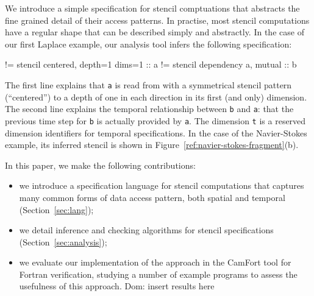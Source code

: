 \documentclass[9pt]{sigplanconf}
\newcommand{\dnote}[1]{\textcolor{darkpurple}{Dom: #1}}
\theoremstyle{definition}
\begin{document}
We introduce a simple specification for stencil comptuations
that abstracts the fine grained detail of their access patterns.
In practise, most stencil computations have a regular shape that
can be described simply and abstractly. In the case of our
first Laplace example, our analysis tool infers the following specification:
%
\begin{SpecVerbatim}
!=  stencil centered, depth=1 dims=1 :: a
!=  stencil dependency a, mutual    :: b
\end{SpecVerbatim}
%
The first line explains that \texttt{a} is read from
with a symmetrical stencil pattern (``centered'') to a depth
of one in each direction in its first (and only) dimension.
The second line explains the temporal relationship between
\texttt{b} and \texttt{a}: that the previous time step for \texttt{b}
is actually provided by \texttt{a}. The dimension \texttt{t} is a
reserved dimension identifiers for temporal specifications. In
the case of the Navier-Stokes example, its inferred stencil is shown
in Figure~\ref{ref:navier-stokes-fragment}(b).

In this paper, we make the following contributions:
%
\begin{itemize}
\item we introduce a specification language for
stencil computations that captures many common forms
of data access pattern, both spatial and temporal (Section~\ref{sec:lang});
\item we detail inference and checking
algorithms for stencil specifications (Section~\ref{sec:analysis});
\item we evaluate our implementation of the approach
in the CamFort tool for Fortran verification, studying
a number of example programs to assess the usefulness
of this approach.
\dnote{insert results here}
\end{itemize}
%
\end{document}

